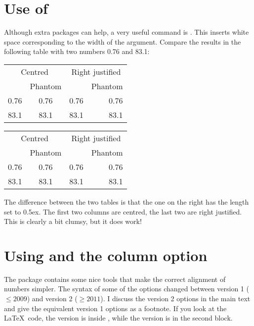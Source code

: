 \section{Use of }%
\label{sec:table:phantom}

Although extra packages can help, a very useful command is
. This inserts white space corresponding to the width
of the argument. Compare the results in the following table with two
numbers 0.76 and 83.1:

\begin{center}
\begin{tabular}{cc|rr} %
  \multicolumn{2}{c|}{Centred} &
  \multicolumn{2}{c}{Right justified} \\
  & Phantom & & Phantom\\\hline %
  0.76 & \phantom{0}0.76 & 0.76 & 0.76\\
  83.1 & 83.1\phantom{0} & 83.1 & 83.1\phantom{0}
\end{tabular}
\qquad
{\setlength{\extrarowheight}{0.5ex}
\begin{tabular}{cc|rr} %
  \multicolumn{2}{c|}{Centred} &
  \multicolumn{2}{c}{Right justified} \\
  & Phantom & & Phantom\\\hline %
  0.76 & \phantom{0}0.76 & 0.76 & 0.76\\
  83.1 & 83.1\phantom{0} & 83.1 & 83.1\phantom{0}
\end{tabular}
}
\end{center}
\par\noindent
The difference between the two tables is that the one on the right
has the length  set to 0.5ex.  The first two
columns are centred, the last two are right justified.  This is
clearly a bit clumsy, but it does work!


\section{Using  and the  column option}%
\label{sec:table:siunitx}

The  package contains some nice tools that make the
correct alignment of numbers simpler. The syntax of some of the
options changed between version 1 (\(\leq 2009\)) and version 2 (\(\geq 2011\)). I
discuss the version 2 options in the main text and give the equivalent
version 1 options as a footnote. If you look at the \LaTeX\ code, the
 version is inside , while the  version is in the second
block.

